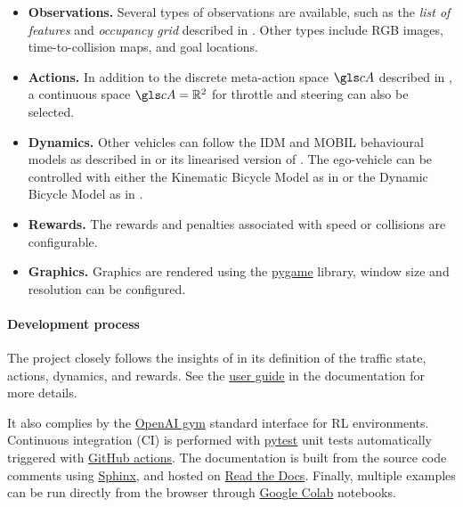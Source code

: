 \begin{itemize}
	\item \textbf{Observations.} Several types of observations are available, such as the \emph{list of features} and \emph{occupancy grid} described in . Other types include RGB images, time-to-collision maps, and goal locations.
	\item \textbf{Actions.} In addition to the discrete meta-action space $\cA$ described in , a continuous space $\cA=\Real^2$ for throttle and steering can also be selected.
	\item \textbf{Dynamics.} Other vehicles can follow the \gls{IDM} and \gls{MOBIL} behavioural models as described in   or its linearised version of . The ego-vehicle can be controlled with either the Kinematic Bicycle Model as in  or the Dynamic Bicycle Model as in  .
	\item \textbf{Rewards.} The rewards and penalties associated with speed or collisions are configurable.
	\item \textbf{Graphics.} Graphics are rendered using the \href{https://www.pygame.org/news}{pygame} library, window size and resolution can be configured.
\end{itemize} 


\paragraph{Development process}

The project closely follows the insights of  in its definition of the traffic state, actions, dynamics, and rewards. See the \href{https://highway-env.readthedocs.io/en/latest/user\_guide.html}{user guide} in the documentation for more details.

It also complies by the \href{https://github.com/openai/gym}{OpenAI gym} standard interface for \gls{RL} environments. Continuous integration (CI) is performed with \href{https://docs.pytest.org/en/stable/}{pytest} unit tests automatically triggered with \href{https://github.com/features/actions}{GitHub actions}. The documentation is built from the source code comments using \href{https://www.sphinx-doc.org/en/master/}{Sphinx}, and hosted on \href{https://readthedocs.org/}{Read the Docs}. Finally, multiple examples can be run directly from the browser through \href{https://colab.research.google.com/}{Google Colab} notebooks.

